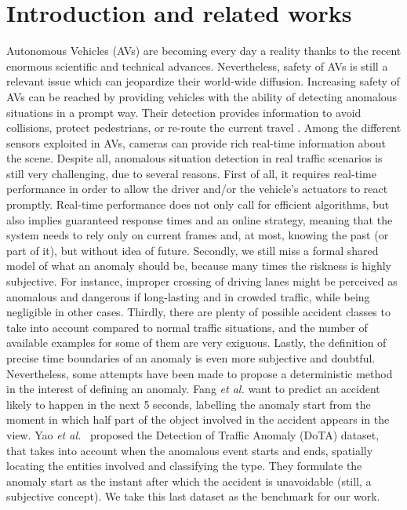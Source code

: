 \section{Introduction and related works}

Autonomous Vehicles (AVs) are becoming every day a reality thanks to the recent enormous scientific and technical advances.
Nevertheless, safety of AVs is still a relevant issue which can jeopardize their world-wide diffusion.
Increasing safety of AVs can be reached by providing vehicles with the ability of detecting anomalous situations in a prompt way.
Their detection provides information to avoid collisions, protect pedestrians, or re-route the current travel \cite{4298901}.
Among the different sensors exploited in AVs, cameras can provide rich real-time information about the scene.
Despite all, anomalous situation detection in real traffic scenarios is still very challenging, due to several reasons.
First of all, it requires real-time performance in order to allow the driver and/or the vehicle's actuators to react promptly.
Real-time performance does not only call for efficient algorithms, but also implies guaranteed response times and an online strategy, meaning that the system needs to rely only on current frames and, at most, knowing the past (or part of it), but without idea of future.
Secondly, we still miss a formal shared model of what an anomaly should be, because many times the riskness is highly subjective.
For instance, improper crossing of driving lanes might be perceived as anomalous and dangerous if long-lasting and in crowded traffic, while being negligible in other cases.
Thirdly, there are plenty of possible accident classes to take into account compared to normal traffic situations, and the number of available examples for some of them are very exiguous.
Lastly, the definition of precise time boundaries of an anomaly is even more subjective and doubtful.
Nevertheless, some attempts have been made to propose a deterministic method in the interest of defining an anomaly.
Fang \emph{et al.} \cite{fang2019dada} want to predict an accident likely to happen in the next 5 seconds, labelling the anomaly start from the moment in which half part of the object involved in the accident appears in the view.
Yao \emph{et al.}~\cite{9712446} proposed the Detection of Traffic Anomaly (DoTA) dataset, that takes into account when the anomalous event starts and ends, spatially locating the entities involved and classifying the type.
They formulate the anomaly start as the instant after which the accident is unavoidable (still, a subjective concept).
We take this last dataset as the benchmark for our work.


